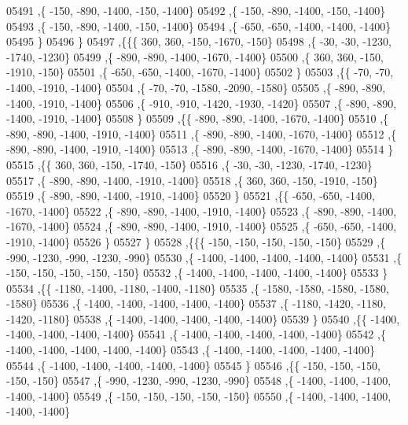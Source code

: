 \begin{DoxyCode}
05491     ,\{  -150,  -890, -1400,  -150, -1400\}
05492     ,\{  -150,  -890, -1400,  -150, -1400\}
05493     ,\{  -150,  -890, -1400,  -150, -1400\}
05494     ,\{  -650,  -650, -1400, -1400, -1400\}
05495     \}
05496    \}
05497   ,\{\{\{   360,   360,  -150, -1670,  -150\}
05498     ,\{   -30,   -30, -1230, -1740, -1230\}
05499     ,\{  -890,  -890, -1400, -1670, -1400\}
05500     ,\{   360,   360,  -150, -1910,  -150\}
05501     ,\{  -650,  -650, -1400, -1670, -1400\}
05502     \}
05503    ,\{\{   -70,   -70, -1400, -1910, -1400\}
05504     ,\{   -70,   -70, -1580, -2090, -1580\}
05505     ,\{  -890,  -890, -1400, -1910, -1400\}
05506     ,\{  -910,  -910, -1420, -1930, -1420\}
05507     ,\{  -890,  -890, -1400, -1910, -1400\}
05508     \}
05509    ,\{\{  -890,  -890, -1400, -1670, -1400\}
05510     ,\{  -890,  -890, -1400, -1910, -1400\}
05511     ,\{  -890,  -890, -1400, -1670, -1400\}
05512     ,\{  -890,  -890, -1400, -1910, -1400\}
05513     ,\{  -890,  -890, -1400, -1670, -1400\}
05514     \}
05515    ,\{\{   360,   360,  -150, -1740,  -150\}
05516     ,\{   -30,   -30, -1230, -1740, -1230\}
05517     ,\{  -890,  -890, -1400, -1910, -1400\}
05518     ,\{   360,   360,  -150, -1910,  -150\}
05519     ,\{  -890,  -890, -1400, -1910, -1400\}
05520     \}
05521    ,\{\{  -650,  -650, -1400, -1670, -1400\}
05522     ,\{  -890,  -890, -1400, -1910, -1400\}
05523     ,\{  -890,  -890, -1400, -1670, -1400\}
05524     ,\{  -890,  -890, -1400, -1910, -1400\}
05525     ,\{  -650,  -650, -1400, -1910, -1400\}
05526     \}
05527    \}
05528   ,\{\{\{  -150,  -150,  -150,  -150,  -150\}
05529     ,\{  -990, -1230,  -990, -1230,  -990\}
05530     ,\{ -1400, -1400, -1400, -1400, -1400\}
05531     ,\{  -150,  -150,  -150,  -150,  -150\}
05532     ,\{ -1400, -1400, -1400, -1400, -1400\}
05533     \}
05534    ,\{\{ -1180, -1400, -1180, -1400, -1180\}
05535     ,\{ -1580, -1580, -1580, -1580, -1580\}
05536     ,\{ -1400, -1400, -1400, -1400, -1400\}
05537     ,\{ -1180, -1420, -1180, -1420, -1180\}
05538     ,\{ -1400, -1400, -1400, -1400, -1400\}
05539     \}
05540    ,\{\{ -1400, -1400, -1400, -1400, -1400\}
05541     ,\{ -1400, -1400, -1400, -1400, -1400\}
05542     ,\{ -1400, -1400, -1400, -1400, -1400\}
05543     ,\{ -1400, -1400, -1400, -1400, -1400\}
05544     ,\{ -1400, -1400, -1400, -1400, -1400\}
05545     \}
05546    ,\{\{  -150,  -150,  -150,  -150,  -150\}
05547     ,\{  -990, -1230,  -990, -1230,  -990\}
05548     ,\{ -1400, -1400, -1400, -1400, -1400\}
05549     ,\{  -150,  -150,  -150,  -150,  -150\}
05550     ,\{ -1400, -1400, -1400, -1400, -1400\}

\end{DoxyCode}
